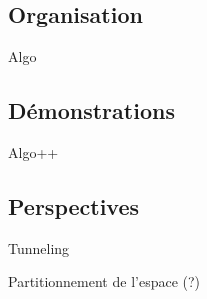 \documentclass{beamer}
\begin{document}
\subsection{Organisation}

\begin{frame}
  Algo
\end{frame}

\subsection{Démonstrations}

\begin{frame}
  Algo++
\end{frame}

\subsection{Perspectives}

\begin{frame}
  Tunneling
\end{frame}

\begin{frame}
  Partitionnement de l'espace (?)
\end{frame}
\end{document}
